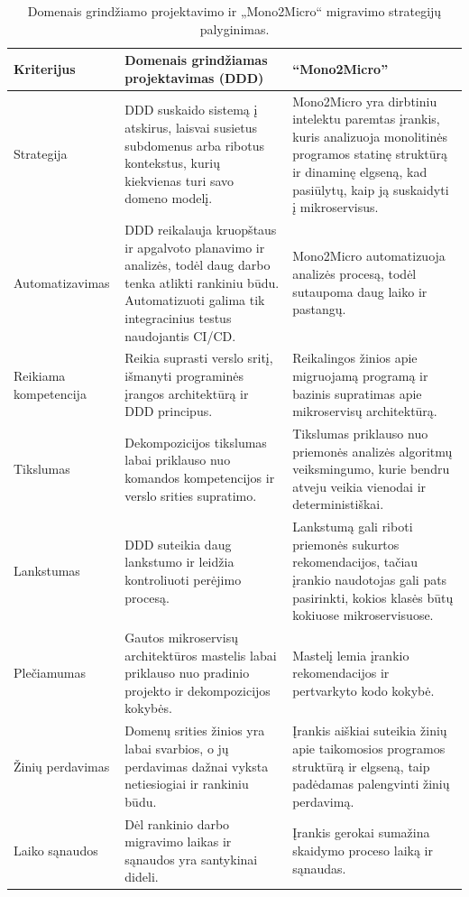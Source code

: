 \documentclass{VUMIFPSbakalaurinis}
\begin{document}
\begin{table}
\centering
\begin{tabularx}{\textwidth}{|l|X|X|}
\hline
\textbf{Kriterijus} & \textbf{Domenais grindžiamas projektavimas (DDD)} & \textbf{\enquote{Mono2Micro}} \\ 
\hline
Strategija & DDD suskaido sistemą į atskirus, laisvai susietus subdomenus arba ribotus kontekstus, kurių kiekvienas turi savo domeno modelį. &  Mono2Micro yra dirbtiniu intelektu paremtas įrankis, kuris analizuoja monolitinės programos statinę struktūrą ir dinaminę elgseną, kad pasiūlytų, kaip ją suskaidyti į mikroservisus. \\
\hline
Automatizavimas & DDD reikalauja kruopštaus ir apgalvoto planavimo ir analizės, todėl daug darbo tenka atlikti rankiniu būdu. Automatizuoti galima tik integracinius testus naudojantis CI/CD. & Mono2Micro automatizuoja analizės procesą, todėl sutaupoma daug laiko ir pastangų. \\
\hline
Reikiama kompetencija & Reikia suprasti verslo sritį, išmanyti programinės įrangos architektūrą ir DDD principus. &  Reikalingos žinios apie migruojamą programą ir bazinis supratimas apie mikroservisų architektūrą. \\
\hline
Tikslumas & Dekompozicijos tikslumas labai priklauso nuo komandos kompetencijos ir verslo srities supratimo. & Tikslumas priklauso nuo priemonės analizės algoritmų veiksmingumo, kurie bendru atveju veikia vienodai ir deterministiškai. \\
\hline
Lankstumas & DDD suteikia daug lankstumo ir leidžia kontroliuoti perėjimo procesą. & Lankstumą gali riboti priemonės sukurtos rekomendacijos, tačiau įrankio naudotojas gali pats pasirinkti, kokios klasės būtų kokiuose mikroservisuose. \\
\hline
Plečiamumas & Gautos mikroservisų architektūros mastelis labai priklauso nuo pradinio projekto ir dekompozicijos kokybės. & Mastelį lemia įrankio rekomendacijos ir pertvarkyto kodo kokybė. \\
\hline
Žinių perdavimas & Domenų srities žinios yra labai svarbios, o jų perdavimas dažnai vyksta netiesiogiai ir rankiniu būdu. & Įrankis aiškiai suteikia žinių apie taikomosios programos struktūrą ir elgseną, taip padėdamas palengvinti žinių perdavimą. \\
\hline
Laiko sąnaudos & Dėl rankinio darbo migravimo laikas ir sąnaudos yra santykinai dideli. & Įrankis gerokai sumažina skaidymo proceso laiką ir sąnaudas. \\
\hline
\end{tabularx}
\caption{Domenais grindžiamo projektavimo ir „Mono2Micro“ migravimo strategijų palyginimas.}
\label{tab:comparison}
\end{table}
\end{document}
